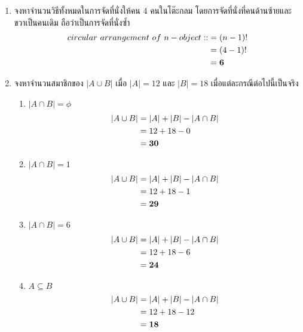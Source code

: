 \documentclass{article}
\begin{document}
\begin{enumerate}
	\item จงหาจำนวนวิธีทั้งหมดในการจัดที่นั่งให้คน 4 คนในโต๊ะกลม โดยการจัดที่นั่งที่คนด้านซ้ายและขวาเป็นคนเดิม\newline
	ถือว่าเป็นการจัดที่นั่งซ้ำ
        	\begin{equation}
        	\begin{split}
	circular~arrangement~of~n-object ::&= (n - 1)! \notag\\
        &= (4 - 1)! \\
        &= \mathbf{6}
        	\end{split}
        	\end{equation}
	
	\item จงหาจำนวนสมาชิกของ $|A \cup B|$ เมื่อ $|A| = 12$ และ $|B| = 18$ เมื่อแต่ละกรณีต่อไปนี้เป็นจริง
	\begin{enumerate}
		\item $|A \cap B| = \phi$
		\begin{equation}
		\begin{split}
		|A \cup B| &= |A| + |B| - |A \cap B| \notag\\
		&= 12 + 18 - 0 \\
		&=  \mathbf{30}
		\end{split}
		\end{equation}
		
		\item $|A \cap B| = 1$
		\begin{equation}
		\begin{split}
		|A \cup B| &= |A| + |B| - |A \cap B| \notag\\
		&= 12 + 18 - 1 \\
		&=  \mathbf{29}
		\end{split}
		\end{equation}
		
		\item $|A \cap B| = 6$
		\begin{equation}
		\begin{split}
		|A \cup B| &= |A| + |B| - |A \cap B| \notag\\
		&= 12 + 18 - 6 \\
		&=  \mathbf{24}
		\end{split}
		\end{equation}
		
		\item $A \subseteq B$
		\begin{equation}
		\begin{split}
		|A \cup B| &= |A| + |B| - |A \cap B| \notag\\
		&= 12 + 18 - 12 \\
		&=  \mathbf{18}
		\end{split}
		\end{equation}
		

\end{enumerate}
\end{enumerate}
\end{document}

